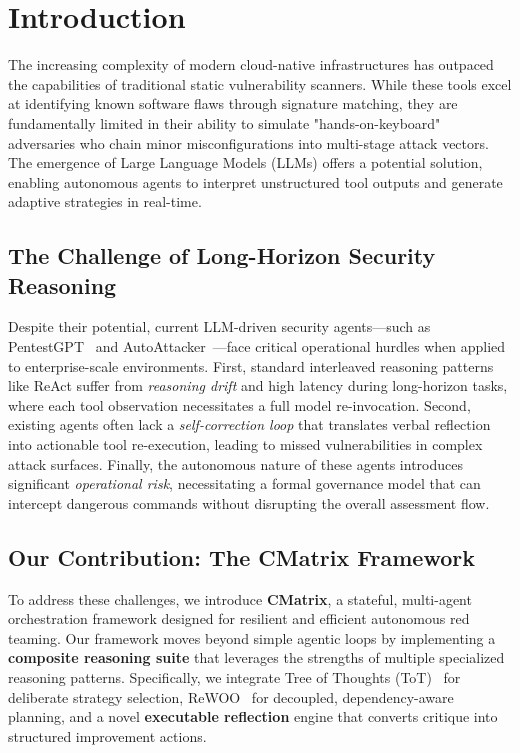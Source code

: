 \section{Introduction}

The increasing complexity of modern cloud-native infrastructures has outpaced the capabilities of traditional static vulnerability scanners. While these tools excel at identifying known software flaws through signature matching, they are fundamentally limited in their ability to simulate "hands-on-keyboard" adversaries who chain minor misconfigurations into multi-stage attack vectors. The emergence of Large Language Models (LLMs) offers a potential solution, enabling autonomous agents to interpret unstructured tool outputs and generate adaptive strategies in real-time.

\subsection{The Challenge of Long-Horizon Security Reasoning}
Despite their potential, current LLM-driven security agents—such as PentestGPT~\cite{pentestgpt} and AutoAttacker~\cite{autoattacker}—face critical operational hurdles when applied to enterprise-scale environments. First, standard interleaved reasoning patterns like ReAct suffer from \textit{reasoning drift} and high latency during long-horizon tasks, where each tool observation necessitates a full model re-invocation. Second, existing agents often lack a \textit{self-correction loop} that translates verbal reflection into actionable tool re-execution, leading to missed vulnerabilities in complex attack surfaces. Finally, the autonomous nature of these agents introduces significant \textit{operational risk}, necessitating a formal governance model that can intercept dangerous commands without disrupting the overall assessment flow.

\subsection{Our Contribution: The CMatrix Framework}
To address these challenges, we introduce \textbf{CMatrix}, a stateful, multi-agent orchestration framework designed for resilient and efficient autonomous red teaming. Our framework moves beyond simple agentic loops by implementing a \textbf{composite reasoning suite} that leverages the strengths of multiple specialized reasoning patterns. Specifically, we integrate Tree of Thoughts (ToT)~\cite{tot} for deliberate strategy selection, ReWOO~\cite{rewoo} for decoupled, dependency-aware planning, and a novel \textbf{executable reflection} engine that converts critique into structured improvement actions.

